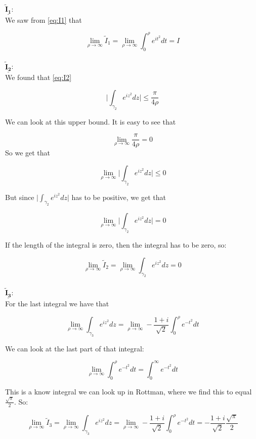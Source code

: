 \documentclass[a4paper,norsk, 10pt]{article}
\begin{document}
$\underline{\mathbf{\tilde{I}_1}}$:\\

We saw from \eqref{eq:I1} that

\begin{equation}
\lim_{\rho \rightarrow \infty} \tilde{I}_1 = \lim_{\rho \rightarrow \infty} \int_0^{\rho} e^{it^2} dt = I
\label{eq:I1rhoInf}
\end{equation}\\

$\underline{\mathbf{\tilde{I}_2}}$:\\

We found that \eqref{eq:I2}

$$
\bigg|\int_{\gamma_2}e^{iz^2}dz \bigg| \leq \frac{\pi}{4\rho}
$$

We can look at this upper bound. It is easy to see that

$$
\lim_{\rho\rightarrow \infty} \frac{\pi}{4\rho} = 0
$$
So we get that

$$
\lim_{\rho \rightarrow \infty } \bigg|\int_{\gamma_2}e^{iz^2}dz \bigg| \leq 0
$$

But since $\big|\int_{\gamma_2}e^{iz^2}dz \big|$ has to be positive, we get that

$$
\lim_{\rho \rightarrow \infty } \bigg|\int_{\gamma_2}e^{iz^2}dz \bigg| = 0
$$

If the length of the integral is zero, then the integral has to be zero, so:

\begin{equation}
\lim_{\rho \rightarrow \infty} \tilde{I}_2 = \lim_{\rho \rightarrow \infty}  \int_{\gamma_2}e^{iz^2}dz = 0
\label{I2rhoInf}
\end{equation}\\

$\underline{\mathbf{\tilde{I}_3}}$:\\

For the last integral we have that 

$$
\lim_{\rho \rightarrow \infty}  \int_{\gamma_3}e^{iz^2}dz = \lim_{\rho \rightarrow \infty} -\frac{1+i}{\sqrt{2}}  \int_0^{\rho}e^{-t^2}dt 
$$

We can look at the last part of that integral:

$$
\lim_{\rho \rightarrow \infty} \int_0^{\rho}e^{-t^2}dt  = \int_0^{\infty}e^{-t^2}dt
$$

This is a know integral we can look up in Rottman, where we find this to equal $\frac{\sqrt{\pi}}{2}$. So:

\begin{equation}
\lim_{\rho \rightarrow \infty} \tilde{I}_3 = \lim_{\rho \rightarrow \infty} \int_{\gamma_3}e^{iz^2}dz = \lim_{\rho \rightarrow \infty} -\frac{1+i}{\sqrt{2}}  \int_0^{\rho}e^{-t^2}dt = -\frac{1+i}{\sqrt{2}} \frac{\sqrt{\pi}}{2}
\label{I3rhoinf}
\end{equation}\\
\end{document}
